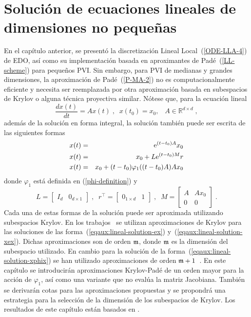 \chapter{Solución de ecuaciones lineales de dimensiones no pequeñas}\label{chapter:solve-non-smal-lineal-eq}

En el capítulo anterior, se presentó la discretización Lineal Local~(\ref{ODE-LLA-4}) de EDO, así como su implementación basada en aproximantes de Padé~(\ref{LL-scheme}) para pequeños PVI. Sin embargo, para PVI de medianas y grandes dimensiones, la aproximación de Padé~(\ref{P-MA-2}) no es computacionalmente eficiente y necesita ser reemplazada por otra aproximación basada en subespacios de Krylov o alguna técnica proyectiva similar. Nótese que, para la ecuación lineal
\begin{equation*}
	\frac{dx(t)}{dt}=Ax(t)\;,\;\; x(t_0)=x_0,\;\;\; A\in\mathbb{R}^{d\times d}\;,
\end{equation*}
además de la solución en forma integral, la solución también puede ser escrita de las siguientes formas
\begin{eqnarray}
	x(t) & = & \mathrm{e}^{(t-t_0)A}x_0 \label{eqaux:lineal-solution-ex} \\
	x(t) & = & x_0 + L\mathrm{e}^{(t-t_0)M}r \label{eqaux:lineal-solution-xex} \\
	x(t) & = & x_0 + (t-t_0)\varphi_1((t-t_0)A)Ax_0 \label{eqaux:lineal-solution-xphix}
\end{eqnarray}
donde $\varphi_1$ está definida en (\ref{phi-definition}) y
\begin{equation*}
	L=\left[ \begin{array}{ll} I_{d} & 0_{d\times 1}\end{array} \right] \;,\;\;
	r^{\intercal }=\left[ \begin{array}{ll} 0_{1\times d} & 1\end{array}\right] \;,\;\;
	M=\left[
	\begin{array}{cc}
	A & Ax_0 \\
	0 & 0
	\end{array}
	\right]\;.
\end{equation*}
Cada una de estas formas de la solución puede ser aproximada utilizando subespacios Krylov. En los trabajos~\cite{Saad92,jimenez2012convergence} se utilizan aproximaciones de Krylov para las soluciones de las forma~(\ref{eqaux:lineal-solution-ex}) y~(\ref{eqaux:lineal-solution-xex}). Dichas aproximaciones son de orden $\mathfrak{m}$, donde $\mathfrak{m}$ es la dimensión del subespacio utilizado. En cambio para la solución de la forma~(\ref{eqaux:lineal-solution-xphix}) se han utilizado aproximaciones de orden  $\mathfrak{m}+1$~\cite{sidje1998expokit,niesen2012algorithm}. En este capítulo se introducirán aproximaciones Krylov-Padé de un orden mayor para la acción de $\varphi_1$, así como una variante que no evalúa la matriz Jacobiana. También se derivarán cotas para las aproximaciones propuestas y se propondrá una estrategia para la selección de la dimensión de los subespacios de Krylov. Los resultados de este capítulo están basados en \cite{naranjo2023computing,naranjo2023RT,naranjo2021locally,naranjo2023jacobian}.

